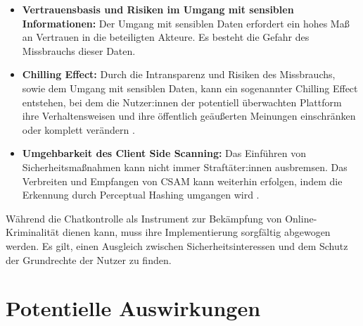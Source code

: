 \documentclass[a4paper]{article}
\begin{document}
\begin{itemize}
  \item \textbf{Vertrauensbasis und Risiken im Umgang mit sensiblen Informationen:} Der Umgang mit sensiblen Daten erfordert ein hohes Maß an Vertrauen in die beteiligten Akteure. Es besteht die Gefahr des Missbrauchs dieser Daten.

  \item \textbf{Chilling Effect:} Durch die Intransparenz und Risiken des Missbrauchs, sowie dem Umgang mit sensiblen Daten, kann ein sogenannter Chilling Effect entstehen, bei dem die Nutzer:innen der potentiell überwachten Plattform ihre Verhaltensweisen und ihre öffentlich geäußerten Meinungen einschränken oder komplett verändern \cite{chilling_effect}.

  \item \textbf{Umgehbarkeit des Client Side Scanning:} Das Einführen von Sicherheitsmaßnahmen kann nicht immer Straftäter:innen ausbremsen. Das Verbreiten und Empfangen von CSAM kann weiterhin erfolgen, indem die Erkennung durch Perceptual Hashing umgangen wird \cite{detection_avoidance}.
\end{itemize}

Während die Chatkontrolle als Instrument zur Bekämpfung von Online-Kriminalität dienen kann, muss ihre Implementierung sorgfältig abgewogen werden. Es gilt, einen Ausgleich zwischen Sicherheitsinteressen und dem Schutz der Grundrechte der Nutzer zu finden.

\section{Potentielle Auswirkungen}
\end{document}

